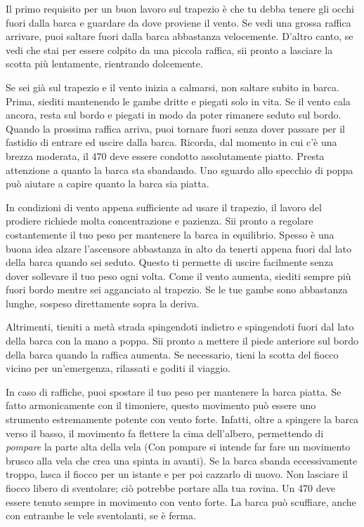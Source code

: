 Il primo requisito per un buon lavoro sul trapezio è che tu debba tenere gli
occhi fuori dalla barca e guardare da dove proviene il vento. Se vedi una grossa
raffica arrivare, puoi saltare fuori dalla barca abbastanza velocemente. D'altro
canto, se vedi che stai per essere colpito da una piccola raffica, sii pronto a
lasciare la scotta più lentamente, rientrando dolcemente.

Se sei già sul trapezio e il vento inizia a calmarsi, non saltare subito in
barca. Prima, siediti mantenendo le gambe dritte e piegati solo in vita. Se il
vento cala ancora, resta sul bordo e piegati in modo da poter rimanere seduto
sul bordo. Quando la prossima raffica arriva, puoi tornare fuori senza
dover passare per il fastidio di entrare ed uscire dalla barca. Ricorda, dal
momento in cui c'è una brezza moderata, il 470 deve essere condotto assolutamente
piatto. Presta attenzione a quanto la barca sta sbandando. Uno sguardo allo
specchio di poppa può aiutare a capire quanto la barca sia piatta.

In condizioni di vento appena sufficiente ad usare il trapezio, il lavoro del
prodiere richiede molta concentrazione e
pazienza. Sii pronto a regolare costantemente il tuo peso per mantenere la barca
in equilibrio. Spesso è una buona idea alzare l'ascensore abbastanza in alto da
tenerti appena fuori dal lato della barca quando sei seduto. Questo ti permette
di uscire facilmente senza dover sollevare il tuo peso ogni volta. Come il vento
aumenta, siediti sempre più fuori bordo mentre sei agganciato al trapezio. Se le
tue gambe sono abbastanza lunghe, sospeso direttamente sopra la deriva.

Altrimenti, tieniti a metà strada spingendoti indietro e spingendoti fuori dal lato
della barca con la mano a poppa. Sii pronto a mettere il piede anteriore sul
bordo della barca quando la raffica aumenta. Se necessario, tieni la scotta del
fiocco vicino per un'emergenza, rilassati e goditi il viaggio.

In caso di raffiche, puoi spostare il tuo peso per mantenere la barca piatta. Se fatto
armonicamente con il timoniere, questo movimento può essere uno strumento
estremamente potente con vento forte. Infatti, oltre a spingere la barca verso il basso,
il movimento fa flettere la cima dell'albero, permettendo di \emph{pompare} la parte
alta della vela (Con pompare si intende far fare un movimento brusco alla vela
che crea una spinta in avanti). Se la barca sbanda eccessivamente
troppo, lasca il fiocco per un istante e per poi cazzarlo di nuovo. Non lasciare il
fiocco libero di sventolare; ciò potrebbe portare alla tua rovina. Un 470 deve
essere tenuto sempre in movimento con vento forte. La barca può scuffiare,
anche con entrambe le vele sventolanti, se è ferma.

